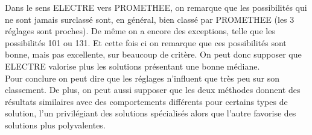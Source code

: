 \documentclass[12pt,a4paper]{article}
\begin{document}
Dans le sens ELECTRE vers PROMETHEE, on remarque que les possibilités qui ne sont jamais surclassé sont, en général, bien classé par PROMETHEE (les 3 réglages sont proches). De même on a encore des exceptions, telle que les possibilités 101 ou 131. Et cette fois ci on remarque que ces possibilités sont bonne, mais pas excellente, sur beaucoup de critère. On peut donc supposer que ELECTRE valorise plus les solutions présentant une bonne médiane.\\

Pour conclure on peut dire que les réglages n'influent que très peu sur son classement. De plus, on peut aussi supposer que les deux méthodes donnent des résultats similaires avec des comportements différents pour certains types de solution, l'un privilégiant des solutions spécialisés alors que l'autre favorise des solutions plus polyvalentes.
\end{document}
